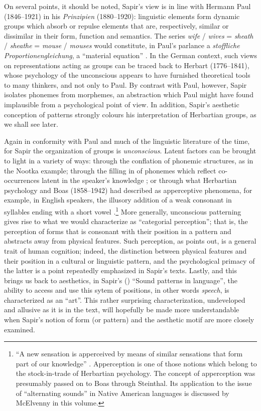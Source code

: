 \documentclass[output=paper]{langscibook}
\begin{document}
On several points, it should be noted, Sapir's view is in line with Hermann Paul (1846--1921) in his \emph{Prinzipien} (1880--1920): linguistic elements form dynamic groups which absorb or repulse elements that are, respectively, similar or dissimilar in their form, function and semantics. The series \emph{wife} / \emph{wives} = \emph{sheath} / \emph{sheathe} = \emph{mouse} / \emph{mouses} would constitute, in Paul's parlance a \emph{stoffliche Proportionengleichung}, a ``material equation'' \citep[86]{Paul1880}. In the German context, such views on representations acting as groups can be traced back to Herbart (1776--1841), whose psychology of the unconscious appears to have furnished theoretical tools to many thinkers, and not only to Paul. By contrast with Paul, however, Sapir isolates phonemes from morphemes, an abstraction which Paul might have found implausible from a psychological point of view. In addition, Sapir's aesthetic conception of patterns strongly colours his interpretation of Herbartian groups, as we shall see later.

Again in conformity with Paul and much of the linguistic literature of the time, for Sapir the organization of groups is \emph{unconscious}. Latent factors can be brought to light in a variety of ways: through the conflation of phonemic structures, as in the Nootka example; through the filling in of phonemes which reflect co-occurrences latent in the speaker’s knowledge \citep[52--53]{Sapir1933}; or through what Herbartian psychology and Boas (1858--1942) had described as apperceptive phenomena, for example, in English speakers, the illusory addition of a weak consonant in syllables ending with a short vowel \citep[58--59]{Sapir1933}.\footnote{``A new sensation is apperceived by means of similar sensations that form part of our knowledge'' \citep[50]{Boas1889}. Apperception is one of those notions which belong to the stock-in-trade of Herbartian psychology. The concept of apperception was presumably passed on to Boas through Steinthal. Its application to the issue of ``alternating sounds'' in Native American languages is discussed by McElvenny in this volume.} More generally, unconscious patterning gives rise to what we would characterize as ``categorial perception''; that is, the perception of forms that is consonant with their position in a pattern and abstracts away from physical features. Such perception, as \citet[46]{Sapir1933} points out, is a general trait of human cognition; indeed, the distinction between physical features and their position in a cultural or linguistic pattern, and the psychological primacy of the latter is a point repeatedly emphasized in Sapir's texts. Lastly, and this brings us back to aesthetics, in Sapir's (\citeyear{Sapir1925}) ``Sound patterns in language'', the ability to access and use this sytem of positions, in other words \emph{speech}, is characterized as an ``art''. This rather surprising characterization, undeveloped and allusive as it is in the text, will hopefully be made more understandable when Sapir's notion of form (or pattern) and the aesthetic motif are more closely examined.
\end{document}
